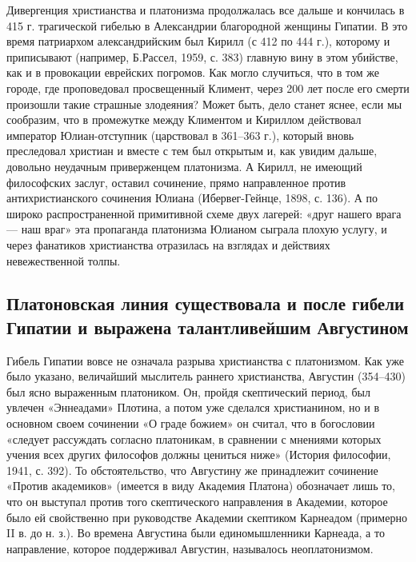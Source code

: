 Дивергенция  христианства  и  платонизма  продолжалась  все  дальше  и
кончилась  в  415 г.  трагической  гибелью  в Александрии  благородной
женщины Гипатии. В это время  патриархом александрийским был Кирилл (с
412 по 444  г.), которому и приписывают (например,  Б.Рассел, 1959, с.
383)  главную вину  в  этом  убийстве, как  и  в провокации  еврейских
погромов. Как могло  случиться, что в том же  городе, где проповедовал
просвещенный  Климент,  через  200  лет  после  его  смерти  произошли
такие  страшные злодеяния?  Может  быть, дело  станет  яснее, если  мы
сообразим,  что в  промежутке  между Климентом  и Кириллом  действовал
император Юлиан-отступник  (царствовал в  361--363 г.),  который вновь
преследовал христиан и вместе с тем был открытым и, как увидим дальше,
довольно  неудачным  приверженцем  платонизма. А  Кирилл,  не  имеющий
философских  заслуг,  оставил  сочинение,  прямо  направленное  против
антихристианского сочинения  Юлиана (Ибервег-Гейнце, 1898, с.  136). А
по  широко  распространенной  примитивной схеме  двух  лагерей:  «друг
нашего врага ---  наш враг» эта пропаганда  платонизма Юлианом сыграла
плохую услугу, и через фанатиков христианства отразилась на взглядах и
действиях невежественной толпы.

\subsection{Платоновская линия  существовала и после гибели  Гипатии и
выражена талантливейшим Августином}

Гибель Гипатии  вовсе не означала разрыва  христианства с платонизмом.
Как  уже  было  указано, величайший  мыслитель  раннего  христианства,
Августин  (354--430)  был  ясно   выраженным  платоником.  Он,  пройдя
скептический  период, был  увлечен  «Эннеадами» Плотина,  а потом  уже
сделался  христианином,  но и  в  основном  своем сочинении  «О  граде
божием»  он  считал, что  в  богословии  «следует рассуждать  согласно
платоникам,  в  сравнении  с   мнениями  которых  учения  всех  других
философов  должны цениться  ниже» (История  философии, 1941,  с. 392).
То  обстоятельство, что  Августину  же  принадлежит сочинение  «Против
академиков» (имеется в виду Академия  Платона) обозначает лишь то, что
он выступал против того  скептического направления в Академии, которое
было  ей  свойственно  при руководстве  Академии  скептиком  Карнеадом
(примерно II в.  до н. з.). Во времена  Августина были единомышленники
Карнеада, а  то направление, которое поддерживал  Августин, называлось
неоплатонизмом.

